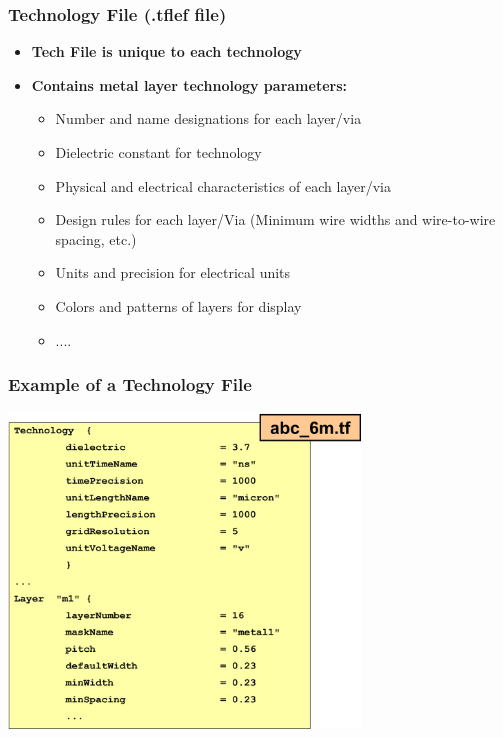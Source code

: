 \documentclass[compress]{beamer}
\begin{document}
\begin{frame}
	\frametitle{Technology File (.tflef file)}
		\begin{itemize}
			\item \textbf{Tech File is unique to each technology}
			\item \textbf{Contains metal layer technology parameters: }
			\begin{itemize}
				\item Number and name designations for each layer/via
				\item Dielectric constant for technology
				\item Physical and electrical characteristics of each layer/via
				\item Design rules for each layer/Via (Minimum wire widths and wire-to-wire spacing, etc.)
				\item Units and precision for electrical units
				\item Colors and patterns of layers for display
				\item ....
			\end{itemize}
		\end{itemize}
\end{frame}

\begin{frame}
	\frametitle{Example of a Technology File }
	\begin{center}
		\includegraphics[width=0.7\textwidth]{TF}
	\end{center}
\end{frame}
\end{document}
